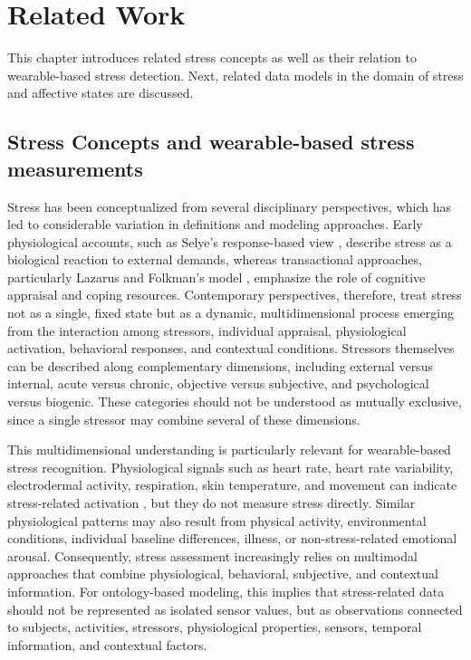 \documentclass[
]{ceurart}
\begin{document}
\section{Related Work} \label{sec:related}
This chapter introduces related stress concepts as well as their relation to wearable-based stress detection. Next, related data models in the domain of stress and affective states are discussed.

\subsection{Stress Concepts and wearable-based stress measurements}
Stress has been conceptualized from several disciplinary perspectives, which has led to considerable variation in definitions and modeling approaches. Early physiological accounts, such as Selye’s response-based view \cite{selye1956stress}, describe stress as a biological reaction to external demands, whereas transactional approaches, particularly Lazarus and Folkman’s model \cite{lazarus1984stress}, emphasize the role of cognitive appraisal and coping resources. Contemporary perspectives, therefore, treat stress not as a single, fixed state but as a dynamic, multidimensional process emerging from the interaction among stressors, individual appraisal, physiological activation, behavioral responses, and contextual conditions. Stressors themselves can be described along complementary dimensions, including external versus internal, acute versus chronic, objective versus subjective, and psychological versus biogenic. These categories should not be understood as mutually exclusive, since a single stressor may combine several of these dimensions.

This multidimensional understanding is particularly relevant for wearable-based stress recognition. Physiological signals such as heart rate, heart rate variability, electrodermal activity, respiration, skin temperature, and movement can indicate stress-related activation \cite{kreibig2010autonomic}, but they do not measure stress directly. Similar physiological patterns may also result from physical activity, environmental conditions, individual baseline differences, illness, or non-stress-related emotional arousal. Consequently, stress assessment increasingly relies on multimodal approaches that combine physiological, behavioral, subjective, and contextual information. For ontology-based modeling, this implies that stress-related data should not be represented as isolated sensor values, but as observations connected to subjects, activities, stressors, physiological properties, sensors, temporal information, and contextual factors.
\end{document}
